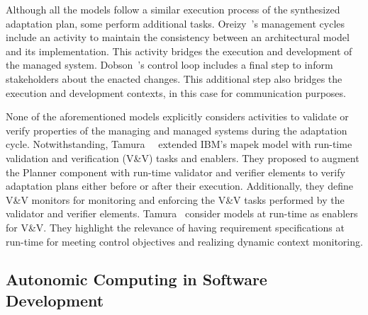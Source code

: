\begin{description}[style=unboxed,leftmargin=0cm,font=\bfseries\normalsize]
	\item[Evolution] Although all the models follow a similar execution process of the synthesized adaptation plan, some perform additional tasks. Oreizy~\etal{}'s management cycles include an activity to maintain the consistency between an architectural model and its implementation. This activity bridges the execution and development of the managed system. Dobson~\etal{}'s control loop includes a final step to inform stakeholders about the enacted changes. This additional step also bridges the execution and development contexts, in this case for communication purposes.
\end{description}

None of the aforementioned models explicitly considers activities to validate or verify properties of the managing and managed systems during the adaptation cycle. Notwithstanding, Tamura~\etal{}~\cite{tamura-2013-towards} extended IBM's \gls{mapek} model with run-time validation and verification (V\&V) tasks and enablers. They proposed to augment the Planner component with run-time validator and verifier elements to verify adaptation plans either before or after their execution. Additionally, they define V\&V monitors for monitoring and enforcing the V\&V tasks performed by the validator and verifier elements. Tamura~\etal{} consider models at run-time as enablers for V\&V. They highlight the relevance of having requirement specifications at run-time for meeting control objectives and realizing dynamic context monitoring.

\subsection{Autonomic Computing in Software Development}
\label{subsect:background--design-time-processes}

%

